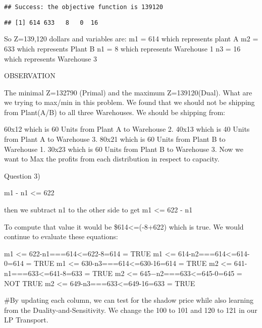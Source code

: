 \documentclass[
]{article}
\newenvironment{Shaded}{\begin{snugshade}}{\end{snugshade}}
\newcommand{\FunctionTok}[1]{\textcolor[rgb]{0.00,0.00,0.00}{#1}}
\newcommand{\NormalTok}[1]{#1}
\newcommand{\SpecialCharTok}[1]{\textcolor[rgb]{0.00,0.00,0.00}{#1}}
\newcommand{\StringTok}[1]{\textcolor[rgb]{0.31,0.60,0.02}{#1}}
\begin{document}
\begin{verbatim}
## Success: the objective function is 139120
\end{verbatim}

\begin{Shaded}
\end{Shaded}

\begin{verbatim}
## [1] 614 633   8   0  16
\end{verbatim}

So Z=139,120 dollars and variables are: m1 = 614 which represents plant
A m2 = 633 which represents Plant B n1 = 8 which represents Warehouse 1
n3 = 16 which represents Warehouse 3

OBSERVATION

The minimal Z=132790 (Primal) and the maximum Z=139120(Dual). What are
we trying to max/min in this problem. We found that we should not be
shipping from Plant(A/B) to all three Warehouses. We should be shipping
from:

60x12 which is 60 Units from Plant A to Warehouse 2. 40x13 which is 40
Units from Plant A to Warehouse 3. 80x21 which is 60 Units from Plant B
to Warehouse 1. 30x23 which is 60 Units from Plant B to Warehouse 3. Now
we want to Max the profits from each distribution in respect to
capacity.

Question 3)

m1 - n1 \textless= 622

then we subtract n1 to the other side to get m1 \textless= 622 - n1

To compute that value it would be \$614\textless=(-8+622) which is true.
We would continue to evaluate these equations:

m1 \textless= 622-n1===614\textless=622-8=614 = TRUE m1 \textless=
614-n2===614\textless=614-0=614 = TRUE m1 \textless=
630-n3===614\textless=630-16=614 = TRUE m2 \textless=
641-n1===633\textless=641-8=633 = TRUE m2 \textless=
645−n2===633\textless=645-0=645 = NOT TRUE m2 \textless=
649-n3===633\textless=649-16=633 = TRUE

\#By updating each column, we can test for the shadow price while also
learning from the Duality-and-Sensitivity. We change the 100 to 101 and
120 to 121 in our LP Transport.
\end{document}
